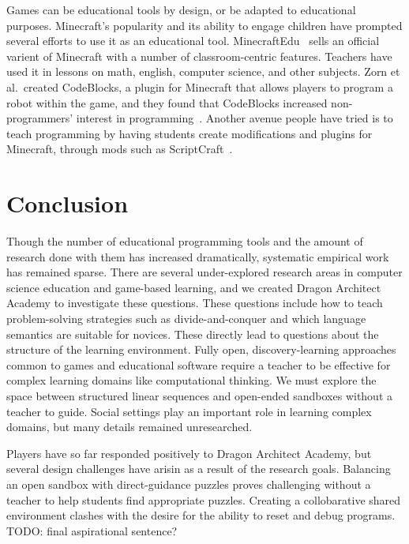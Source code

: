 \documentclass{sig-alternate}
\newcommand{\TODO}[1]{{\color{red} TODO: #1}}
\newcommand{\gametitle}{{\color{RoyalPurple} Dragon Architect Academy}}
\begin{document}
Games can be educational tools by design, or be adapted to educational purposes. 
Minecraft's popularity and its ability to engage children have prompted several efforts to use it as an educational tool.
MinecraftEdu~\cite{minecraftedu} sells an official varient of Minecraft with a number of classroom-centric features. 
Teachers have used it in lessons on math, english, computer science, and other subjects.  
Zorn et al.\ created CodeBlocks, a plugin for Minecraft that allows players to program a robot within the game, and they found that CodeBlocks increased non-programmers' interest in programming~\cite{zorn2013minecraft}.
Another avenue people have tried is to teach programming by having students create modifications and plugins for Minecraft, through mods such as ScriptCraft~\cite{scriptcraft}.

\section{Conclusion}

Though the number of educational programming tools and the amount of research done with them has increased dramatically, systematic empirical work has remained sparse.
There are several under-explored research areas in computer science education and game-based learning, and we created \gametitle{} to investigate these questions.
These questions include how to teach problem-solving strategies such as divide-and-conquer and which language semantics are suitable for novices.
These directly lead to questions about the structure of the learning environment.
Fully open, discovery-learning approaches common to games and educational software require a teacher to be effective for complex learning domains like computational thinking.
We must explore the space between structured linear sequences and open-ended sandboxes without a teacher to guide.
Social settings play an important role in learning complex domains, but many details remained unresearched.

Players have so far responded positively to \gametitle{}, but several design challenges have arisin as a result of the research goals.
Balancing an open sandbox with direct-guidance puzzles proves challenging without a teacher to help students find appropriate puzzles.
Creating a collobarative shared environment clashes with the desire for the ability to reset and debug programs.
\TODO{final aspirational sentence?}



 
\end{document}
